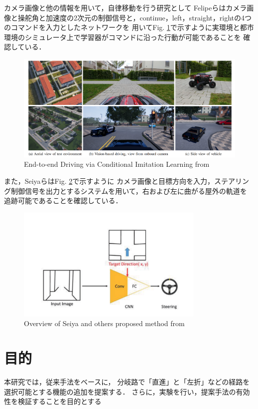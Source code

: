 \newpage
カメラ画像と他の情報を用いて，自律移動を行う研究として
Felipeら\cite{razikon}はカメラ画像と操舵角と加速度の2次元の制御信号と，continue，left，straight，rightの4つのコマンドを入力としたネットワークを
用いてFig. \ref{fig::Conditional_Imitation_Learning}で示すように実環境と都市環境のシミュレータ上で学習器がコマンドに沿った行動が可能であることを
確認している．
\begin{figure}[H]
    \centering
    \includegraphics[width = 12cm]{./figs/End-to-end_Driving_via_Conditional_Imitation_Learning.pdf}
    \caption{End-to-end  Driving  via  Conditional  Imitation  Learning from \cite{razikon}}
    \label{fig::Conditional_Imitation_Learning}
\end{figure}

また，Seiyaら\cite{nagoya}はFig. \ref{fig::nagoyaabst}で示すように
カメラ画像と目標方向を入力，ステアリング制御信号を出力とするシステムを用いて，右および左に曲がる屋外の軌道を
追跡可能であることを確認している．

\begin{figure}[H]
    \centering
    \includegraphics[width = 9cm]{./figs/End-to-End_Navigation_with_Branch_Turning_Support_using_Convolutional_Neural_Network_abst.pdf}
    \caption{Overview of Seiya and others proposed method from \cite{nagoya}}
    \label{fig::nagoyaabst}
\end{figure}


\section{目的}
本研究では，従来手法をベースに，
分岐路で「直進」と「左折」などの経路を選択可能とする機能の追加を提案する．
さらに，実験を行い，提案手法の有効性を検証することを目的とする

